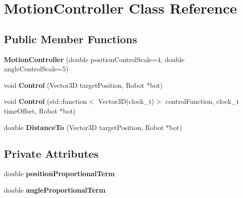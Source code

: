 \hypertarget{class_motion_controller}{\section{Motion\-Controller Class Reference}
\label{class_motion_controller}
}
\subsection*{Public Member Functions}
\begin{DoxyCompactItemize}
\item 
\hypertarget{class_motion_controller_a8c92258d75dc10f2bdca8e0a14ae039c}{{\bfseries Motion\-Controller} (double position\-Control\-Scale=4, double angle\-Control\-Scale=5)}\label{class_motion_controller_a8c92258d75dc10f2bdca8e0a14ae039c}

\item 
\hypertarget{class_motion_controller_a0043b6bf344f40918664ad56e3a9492f}{void {\bfseries Control} (Vector3\-D target\-Position, Robot $\ast$bot)}\label{class_motion_controller_a0043b6bf344f40918664ad56e3a9492f}

\item 
\hypertarget{class_motion_controller_a07481a28b48b73166572d8d9e87631d0}{void {\bfseries Control} (std\-::function$<$ Vector3\-D(clock\-\_\-t)$>$ control\-Function, clock\-\_\-t time\-Offset, Robot $\ast$bot)}\label{class_motion_controller_a07481a28b48b73166572d8d9e87631d0}

\item 
\hypertarget{class_motion_controller_a05cf2fe024107e6f28602344b3e42fcd}{double {\bfseries Distance\-To} (Vector3\-D target\-Position, Robot $\ast$bot)}\label{class_motion_controller_a05cf2fe024107e6f28602344b3e42fcd}

\end{DoxyCompactItemize}
\subsection*{Private Attributes}
\begin{DoxyCompactItemize}
\item 
\hypertarget{class_motion_controller_ae66fbbf39f4e08417ce226aa7b620bee}{double {\bfseries position\-Proportional\-Term}}\label{class_motion_controller_ae66fbbf39f4e08417ce226aa7b620bee}

\item 
\hypertarget{class_motion_controller_a6e7502a544c0f28ddb38d678efe5afc9}{double {\bfseries angle\-Proportional\-Term}}\label{class_motion_controller_a6e7502a544c0f28ddb38d678efe5afc9}

\end{DoxyCompactItemize}


